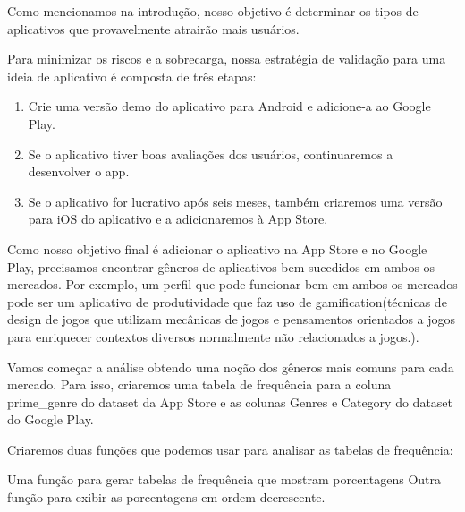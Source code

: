 \documentclass[11pt]{article}
\providecommand{\tightlist}{%
      \setlength{\itemsep}{0pt}\setlength{\parskip}{0pt}}
\begin{document}
Como mencionamos na introdução, nosso objetivo é determinar os tipos de
aplicativos que provavelmente atrairão mais usuários.

Para minimizar os riscos e a sobrecarga, nossa estratégia de validação
para uma ideia de aplicativo é composta de três etapas:

\begin{enumerate}
\def\labelenumi{\arabic{enumi}.}
\tightlist
\item
  Crie uma versão demo do aplicativo para Android e adicione-a ao Google
  Play.
\item
  Se o aplicativo tiver boas avaliações dos usuários, continuaremos a
  desenvolver o app.
\item
  Se o aplicativo for lucrativo após seis meses, também criaremos uma
  versão para iOS do aplicativo e a adicionaremos à App Store.
\end{enumerate}

Como nosso objetivo final é adicionar o aplicativo na App Store e no
Google Play, precisamos encontrar gêneros de aplicativos bem-sucedidos
em ambos os mercados. Por exemplo, um perfil que pode funcionar bem em
ambos os mercados pode ser um aplicativo de produtividade que faz uso de
gamification(técnicas de design de jogos que utilizam mecânicas de jogos
e pensamentos orientados a jogos para enriquecer contextos diversos
normalmente não relacionados a jogos.).

Vamos começar a análise obtendo uma noção dos gêneros mais comuns para
cada mercado. Para isso, criaremos uma tabela de frequência para a
coluna prime\_genre do dataset da App Store e as colunas Genres e
Category do dataset do Google Play.

    Criaremos duas funções que podemos usar para analisar as tabelas de
frequência:

Uma função para gerar tabelas de frequência que mostram porcentagens
Outra função para exibir as porcentagens em ordem decrescente.
\end{document}
